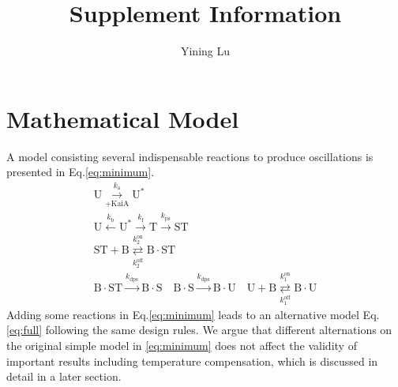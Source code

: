 \documentclass[a4paper,10pt]{article}
\title{Supplement Information}
\author{Yining Lu}
\affil{Department of Mathematics,\\University of Michigan}
\date{}
\numberwithin{equation}{section}
\begin{document}
\maketitle


\section{Mathematical Model}

A model consisting several indispensable  reactions to produce oscillations is presented in Eq.\ref{eq:minimum}. 
\begin{equation}
\begin{gathered}
\mathrm U \overset{k_{\mathrm{a}}}{\underset{+\mathrm {KaiA}}{\longrightarrow}} \mathrm U^{*}\\
\mathrm U \overset{k_{\mathrm {b}}}{\longleftarrow} \mathrm U^{*} \overset{ k_\mathrm f}{\longrightarrow} \mathrm T \overset{ k_\mathrm{ps}}{\longrightarrow} \mathrm{ST} \\
\mathrm {ST}+\mathrm B\overset{ k_{2}^{\mathrm{on}}}{\underset{k_{2}^{\mathrm{off}}}{\rightleftarrows}} \mathrm {B\cdot ST} \\
\mathrm {B\cdot ST} \overset{ k_{\mathrm{dps}}}{\longrightarrow} \mathrm{B\cdot S} \quad
\mathrm {B\cdot S} \overset{ k_{\mathrm{dps}}}{\longrightarrow} \mathrm{B\cdot U} \quad
\mathrm U+\mathrm B\overset{ k_{1}^{\mathrm{on}}}{\underset{k_{1}^{\mathrm{off}}}{\rightleftarrows}} \mathrm {B\cdot U}
\end{gathered}\label{eq:minimum}
\end{equation}
Adding some reactions in Eq.\ref{eq:minimum} leads to an alternative model Eq.\ref{eq:full} following the same design rules. We argue that different alternations on the original simple model in \ref{eq:minimum} does not affect the validity of important results including temperature compensation, which is discussed in detail in a later section.
\end{document}
